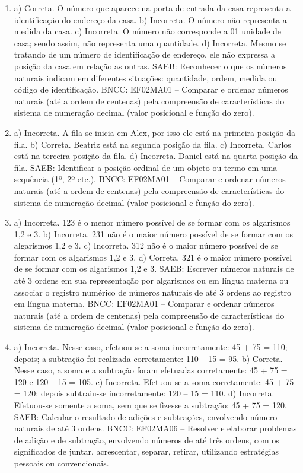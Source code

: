 \begin{enumerate}
\item
a) Correta. O número que aparece na porta de entrada da casa representa a identificação do endereço da casa.
b) Incorreta. O número não representa a medida da casa.
c) Incorreta. O número não corresponde a 01 unidade de casa; sendo assim, não representa uma quantidade.
d) Incorreta. Mesmo se tratando de um número de identificação de endereço, ele não expressa a posição da casa em relação as outras.
SAEB: Reconhecer o que os números naturais indicam em diferentes
situações: quantidade, ordem, medida ou código de identificação.
BNCC: EF02MA01 -- Comparar e ordenar números naturais (até a ordem de
centenas) pela compreensão de características do sistema de numeração
decimal (valor posicional e função do zero).

\item
a) Incorreta. A fila se inicia em Alex, por isso ele está na primeira posição da fila.
b) Correta. Beatriz está na segunda posição da fila.
c) Incorreta. Carlos está na terceira posição da fila.
d) Incorreta. Daniel está na quarta posição da fila.
SAEB: Identificar a posição ordinal de um objeto ou termo em uma
sequência (1º, 2º etc.).
BNCC: EF02MA01 -- Comparar e ordenar números naturais (até a ordem de
centenas) pela compreensão de características do sistema de numeração
decimal (valor posicional e função do zero).

\item
a) Incorreta. 123 é o menor número possível de se formar com os algarismos 1,2 e 3.
b) Incorreta. 231 não é o maior número possível de se formar com os algarismos 1,2 e 3.
c) Incorreta. 312 não é o maior número possível de se  formar com os algarismos 1,2 e 3.
d) Correta. 321 é o maior número possível de se formar com os algarismos 1,2 e 3.
SAEB: Escrever números naturais de até 3 ordens em sua
representação por algarismos ou em língua materna ou associar o registro
numérico de números naturais de até 3 ordens ao registro em língua
materna.
BNCC: EF02MA01 -- Comparar e ordenar números naturais (até a ordem de
centenas) pela compreensão de características do sistema de numeração
decimal (valor posicional e função do zero).

\item
a) Incorreta. Nesse caso, efetuou-se a soma incorretamente: 45 + 75 = 110; depois; a subtração foi realizada corretamente: 110 -- 15 = 95.
b) Correta. Nesse caso, a soma e a subtração foram efetuadas corretamente: 45 + 75 = 120 e 120 -- 15 = 105.
c) Incorreta. Efetuou-se a soma corretamente: 45 + 75 = 120; depois
subtraiu-se incorretamente: 120 -- 15 = 110.
d) Incorreta. Efetuou-se somente a soma, sem que se fizesse a subtração: 45 + 75 = 120.
SAEB: Calcular o resultado de adições e subtrações, envolvendo
número naturais de até 3 ordens.
BNCC: EF02MA06 -- Resolver e elaborar problemas de adição e de subtração,
envolvendo números de até três ordens, com os significados de juntar,
acrescentar, separar, retirar, utilizando estratégias pessoais ou
convencionais.


\end{enumerate}
